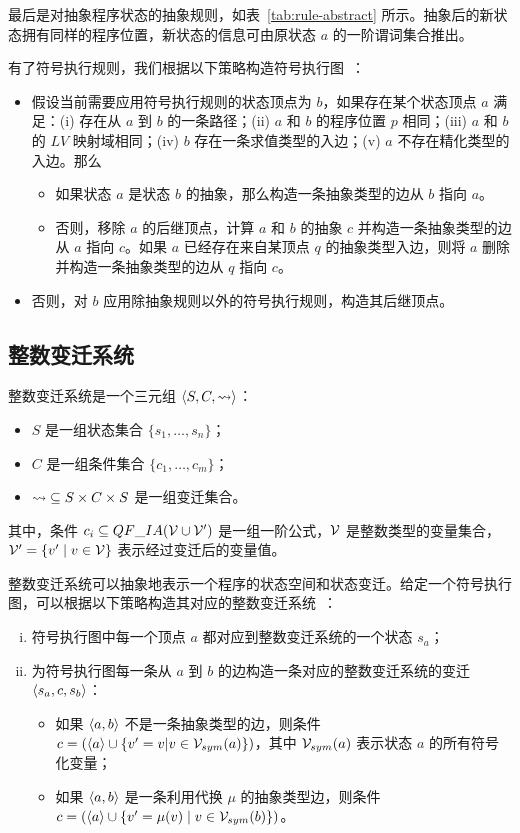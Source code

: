 最后是对抽象程序状态的抽象规则，如表~\ref{tab:rule-abstract} 所示。抽象后的新状态拥有同样的程序位置，新状态的信息可由原状态 $a$ 的一阶谓词集合推出。

有了符号执行规则，我们根据以下策略构造符号执行图~\cite{DBLP:conf/cade/StroderGBFFHS14,DBLP:journals/jar/StroderGBFFHSA17}：
\begin{itemize}
\item 
假设当前需要应用符号执行规则的状态顶点为 $b$，如果存在某个状态顶点 $a$ 满足：(i) 存在从 $a$ 到 $b$ 的一条路径；(ii) $a$ 和 $b$ 的程序位置 $p$ 相同；(iii) $a$ 和 $b$ 的 $LV$ 映射域相同；(iv) $b$ 存在一条求值类型的入边；(v) $a$ 不存在精化类型的入边。那么
\begin{itemize}
\item 如果状态 $a$ 是状态 $b$ 的抽象，那么构造一条抽象类型的边从 $b$ 指向 $a$。
\item 否则，移除 $a$ 的后继顶点，计算 $a$ 和 $b$ 的抽象 $c$ 并构造一条抽象类型的边从 $a$ 指向 $c$。如果 $a$ 已经存在来自某顶点 $q$ 的抽象类型入边，则将 $a$ 删除并构造一条抽象类型的边从 $q$ 指向 $c$。
\end{itemize}
\item
否则，对 $b$ 应用除抽象规则以外的符号执行规则，构造其后继顶点。
\end{itemize}

\subsection{整数变迁系统}

\begin{definition}[整数变迁系统]
整数变迁系统是一个三元组 $\langle S, C, \rightsquigarrow \rangle$：
\begin{itemize}
\item $S$ 是一组状态集合 $\{s_1,\ldots,s_n\}$；
\item $C$ 是一组条件集合 $\{c_1,\ldots,c_m\}$；
\item ${\rightsquigarrow} \subseteq S \times C \times S$ 是一组变迁集合。
\end{itemize}
其中，条件 $c_i \subseteq QF\_IA(\mathcal{V}\cup\mathcal{V}')$ 是一组一阶公式，$\mathcal{V}$ 是整数类型的变量集合，$\mathcal{V}' = \{v' \mid v\in\mathcal{V} \}$ 表示经过变迁后的变量值。
\end{definition}

整数变迁系统可以抽象地表示一个程序的状态空间和状态变迁。给定一个符号执行图，可以根据以下策略构造其对应的整数变迁系统~\cite{DBLP:conf/cade/StroderGBFFHS14,DBLP:journals/jar/StroderGBFFHSA17}：
\begin{enumerate} [(i)]
\item 符号执行图中每一个顶点 $a$ 都对应到整数变迁系统的一个状态 $s_a$；
\item 为符号执行图每一条从 $a$ 到 $b$ 的边构造一条对应的整数变迁系统的变迁 $\langle s_a, c, s_b\rangle$：
\begin{itemize}
\item 如果 $\langle a, b\rangle$ 不是一条抽象类型的边，则条件 $c = (\langle a\rangle \cup \{v' = v | v\in\mathcal{V}_{sym}(a)\})$，其中 $\mathcal{V}_{sym}(a)$ 表示状态 $a$ 的所有符号化变量；
\item 如果 $\langle a, b\rangle$ 是一条利用代换 $\mu$ 的抽象类型边，则条件 $c = (\langle a\rangle \cup \{v'=\mu(v) \mid v\in\mathcal{V}_{sym}(b)\})$。
\end{itemize}
\end{enumerate}

